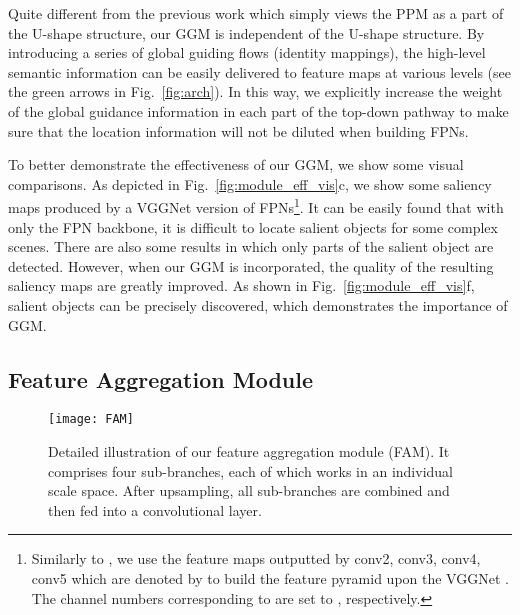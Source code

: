 \documentclass[10pt,twocolumn,letterpaper]{article}
\newcommand{\figref}[1]{Fig.~\ref{#1}}
\begin{document}
Quite different from the previous work \cite{wang2017stagewise} 
which simply views the PPM as a part of the U-shape structure, 
our GGM is independent of the U-shape structure. 
By introducing a series of global guiding flows (identity mappings),
the high-level semantic information can be easily delivered to 
feature maps at various levels (see the green arrows in
\figref{fig:arch}).
In this way, we explicitly increase the weight of the global guidance
information in each part of the top-down pathway to make sure 
that the location information will not be diluted when building FPNs.

To better demonstrate the effectiveness of our GGM,
we show some visual comparisons.
As depicted in \figref{fig:module_eff_vis}c, we show some saliency 
maps produced by a VGGNet version of FPNs\footnote{
Similarly to \cite{lin2017feature}, we use the feature maps outputted by {conv2, conv3, conv4, conv5}
which are denoted by  to build the feature pyramid upon the VGGNet \cite{simonyan2014very}. The channel numbers corresponding to 
are set to , respectively.}.
It can be easily found that with only the FPN backbone, it is 
difficult to locate salient objects for some complex scenes.
There are also some results in which only parts of the salient object 
are detected.
However, when our GGM is incorporated, the quality of the 
resulting saliency maps are greatly improved.
As shown in \figref{fig:module_eff_vis}f, salient objects 
can be precisely discovered, which demonstrates the 
importance of GGM.





























\subsection{Feature Aggregation Module}

\begin{figure}[tp]
  \centering
  \texttt{[image: FAM]}
  \caption{Detailed illustration of our feature aggregation module (FAM). It comprises
  four sub-branches, each of which works in an individual scale space. After upsampling, all
  sub-branches are combined and then fed into a convolutional layer.
  }\label{fig:fam}
  \vspace{-8pt}
\end{figure}
\end{document}
